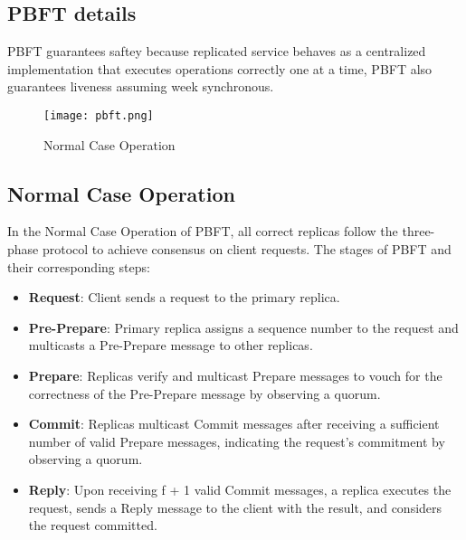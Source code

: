 \documentclass{article}
\begin{document}
\subsection{PBFT details}
PBFT guarantees saftey because replicated service behaves as a centralized implementation that executes operations correctly one at a time, PBFT also guarantees liveness assuming week synchronous.
\begin{figure}[t]
\texttt{[image: pbft.png]}
\centering
\caption{Normal Case Operation}
\end{figure}
\subsection{Normal Case Operation}
In the Normal Case Operation of PBFT, all correct replicas follow the three-phase protocol to achieve consensus on client requests.
The stages of PBFT and their corresponding steps:
\begin{itemize}
    \item \textbf{Request}: Client sends a request to the primary replica.
    \item \textbf{Pre-Prepare}: Primary replica assigns a sequence number to the request and multicasts a Pre-Prepare message to other replicas.
    \item \textbf{Prepare}: Replicas verify and multicast Prepare messages to vouch for the correctness of the Pre-Prepare message by observing a quorum.
    \item \textbf{Commit}: Replicas multicast Commit messages after receiving a sufficient number of valid Prepare messages, indicating the request's commitment by observing a quorum.
    \item \textbf{Reply}: Upon receiving f + 1 valid Commit messages, a replica executes the request, sends a Reply message to the client with the result, and considers the request committed.
\end{itemize}
\end{document}
